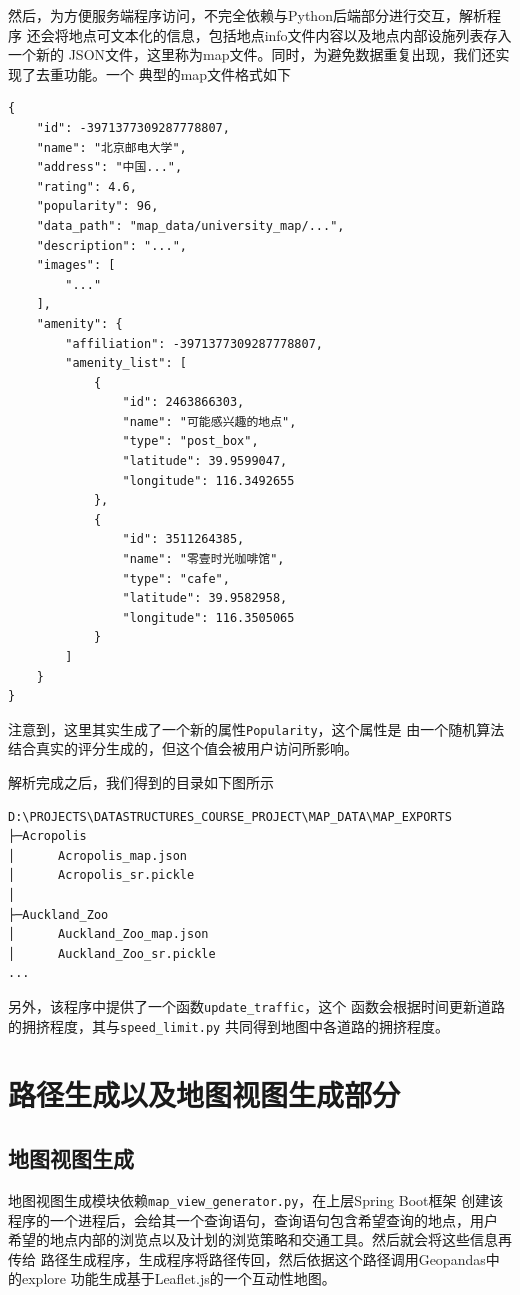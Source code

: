 \documentclass{report}
\begin{document}
然后，为方便服务端程序访问，不完全依赖与Python后端部分进行交互，解析程序
还会将地点可文本化的信息，包括地点info文件内容以及地点内部设施列表存入一个新的
JSON文件，这里称为map文件。同时，为避免数据重复出现，我们还实现了去重功能。一个
典型的map文件格式如下
\begin{verbatim}
{
    "id": -3971377309287778807,
    "name": "北京邮电大学",
    "address": "中国...",
    "rating": 4.6,
    "popularity": 96,
    "data_path": "map_data/university_map/...",
    "description": "...",
    "images": [
        "..."
    ],
    "amenity": {
        "affiliation": -3971377309287778807,
        "amenity_list": [
            {
                "id": 2463866303,
                "name": "可能感兴趣的地点",
                "type": "post_box",
                "latitude": 39.9599047,
                "longitude": 116.3492655
            },
            {
                "id": 3511264385,
                "name": "零壹时光咖啡馆",
                "type": "cafe",
                "latitude": 39.9582958,
                "longitude": 116.3505065
            }
        ]
    }
}
\end{verbatim}
注意到，这里其实生成了一个新的属性\verb|Popularity|，这个属性是
由一个随机算法结合真实的评分生成的，但这个值会被用户访问所影响。
\par
解析完成之后，我们得到的目录如下图所示
\begin{verbatim}
D:\PROJECTS\DATASTRUCTURES_COURSE_PROJECT\MAP_DATA\MAP_EXPORTS
├─Acropolis
│      Acropolis_map.json
│      Acropolis_sr.pickle
│
├─Auckland_Zoo
│      Auckland_Zoo_map.json
│      Auckland_Zoo_sr.pickle
...
\end{verbatim}
另外，该程序中提供了一个函数\verb|update_traffic|，这个
函数会根据时间更新道路的拥挤程度，其与\verb|speed_limit.py|
共同得到地图中各道路的拥挤程度。


\section{路径生成以及地图视图生成部分}
\subsection{地图视图生成}
地图视图生成模块依赖\verb|map_view_generator.py|，在上层Spring Boot框架
创建该程序的一个进程后，会给其一个查询语句，查询语句包含希望查询的地点，用户
希望的地点内部的浏览点以及计划的浏览策略和交通工具。然后就会将这些信息再传给
路径生成程序，生成程序将路径传回，然后依据这个路径调用Geopandas中的explore
功能生成基于Leaflet.js的一个互动性地图。
\end{document}
